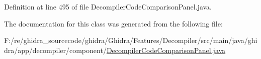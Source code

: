 Definition at line 495 of file Decompiler\+Code\+Comparison\+Panel.\+java.



The documentation for this class was generated from the following file\+:\begin{DoxyCompactItemize}
\item 
F\+:/re/ghidra\+\_\+sourcecode/ghidra/\+Ghidra/\+Features/\+Decompiler/src/main/java/ghidra/app/decompiler/component/\mbox{\hyperlink{_decompiler_code_comparison_panel_8java}{Decompiler\+Code\+Comparison\+Panel.\+java}}\end{DoxyCompactItemize}
